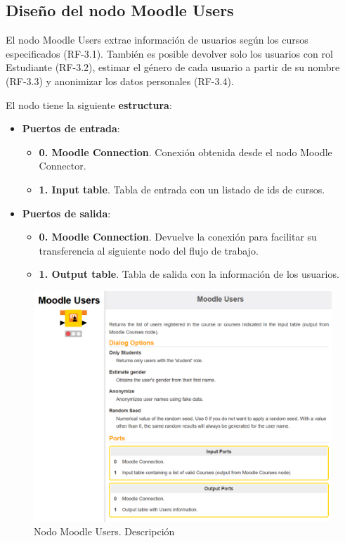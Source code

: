 \newpage
\subsection{Diseño del nodo Moodle Users}

El nodo Moodle Users extrae información de usuarios según los cursos especificados (RF-3.1). 
También es posible devolver solo los usuarios con rol Estudiante (RF-3.2), estimar el género de cada
usuario a partir de su nombre (RF-3.3) y anonimizar los datos personales (RF-3.4). 
\

El nodo tiene la siguiente \textbf{estructura}:

\begin{itemize}
	\item \textbf{Puertos de entrada}: 
    \begin{itemize}
		\item \textbf{0. Moodle Connection}. Conexión obtenida desde el nodo Moodle Connector. 
		\item \textbf{1. Input table}. Tabla de entrada con un listado de ids de cursos. 
   	\end{itemize}

	\item \textbf{Puertos de salida}: 
    \begin{itemize}
		\item \textbf{0. Moodle Connection}. Devuelve la conexión para facilitar su transferencia al siguiente nodo del flujo de trabajo. 
		\item \textbf{1. Output table}. Tabla de salida con la información de los usuarios. 
   	\end{itemize}

\end{itemize}


\begin{figure}[!h]
	\centering
	\includegraphics[width=1\textwidth]{img/nodes_moodle_users.png}
	\caption{Nodo Moodle Users. Descripción}
	\label{fig:moodleusers}
\end{figure}
\FloatBarrier



